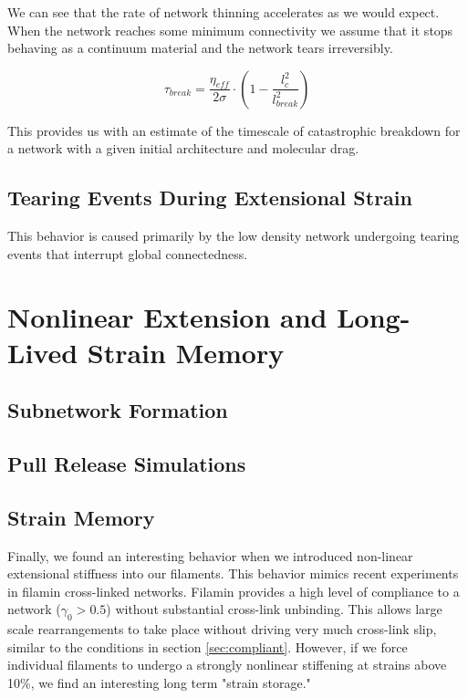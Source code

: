 \documentclass[pre,preprint]{revtex4-1}
\begin{document}
We can see that the rate of network thinning accelerates as we would expect.  When the network reaches some minimum connectivity we assume that it stops behaving as a continuum material and the network tears irreversibly.  

\begin{equation}
\tau_{break} = \frac{\eta_{eff}}{2\sigma}\cdot\left ( 1 -\frac{l_c^2}{l_{break}^2} \right )
\end{equation}

This provides us with an estimate of the timescale of catastrophic breakdown for a network with a given initial architecture and molecular drag.


\subsection{Tearing Events During Extensional Strain}

This behavior is caused primarily by the low density network undergoing tearing events that interrupt global connectedness.  



\section{Nonlinear Extension and Long-Lived Strain Memory}

\subsection{Subnetwork Formation}

\subsection{Pull Release Simulations}

\subsection{Strain Memory}
Finally, we found an interesting behavior when we introduced non-linear extensional stiffness into our filaments.  This behavior mimics recent experiments in filamin cross-linked networks.  Filamin provides a high level of compliance to a network ($\gamma_0>0.5$) without substantial cross-link unbinding.  This allows large scale rearrangements to take place without driving very much cross-link slip, similar to the conditions in section \ref{sec:compliant}.  However, if we force individual filaments to undergo a strongly nonlinear stiffening at strains above 10\%, we find an interesting long term "strain storage."
\end{document}
